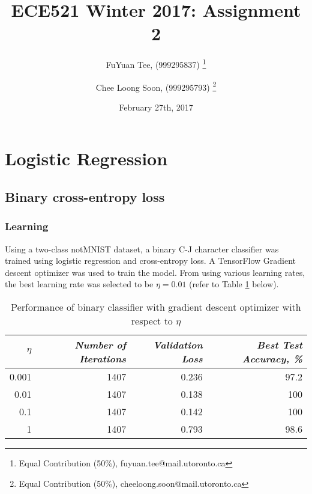 \documentclass[a4paper,12pt]{article}
\title{ECE521 Winter 2017: Assignment 2}
\author{FuYuan Tee, (999295837)
  \thanks{Equal Contribution (50\%), fuyuan.tee@mail.utoronto.ca}
\and Chee Loong Soon, (999295793) \thanks{Equal Contribution (50\%),  cheeloong.soon@mail.utoronto.ca}}
\date{February 27th, 2017}
\begin{document}
\maketitle
\tableofcontents
\clearpage
\section{Logistic Regression}
\subsection{Binary cross-entropy loss}
\subsubsection{Learning}

Using a two-class notMNIST dataset, a binary C-J character classifier was trained using logistic regression and cross-entropy loss. A TensorFlow Gradient descent optimizer was used to train the model. From using various learning rates, the best learning rate was selected to be $\eta = 0.01$ (refer to Table \ref{table:TuneLearningRateSGD} below).

\begin{table}[!htb]
\centering
\caption{Performance of binary classifier with gradient descent optimizer with respect to $\eta$}
\label{table:TuneLearningRateSGD}
\vspace{0.5em}
\begin{tabular}{|r|r r r|} \hline
$\eta$ & \textit{Number of Iterations} & \textit{Validation Loss} & \textit{Best Test Accuracy, \%} \\ \hline
0.001 & 1407 & 0.236 & 97.2 \\
0.01 & 1407 & 0.138 & 100 \\
0.1 & 1407 & 0.142 & 100 \\
1 & 1407 & 0.793 & 98.6 \\
\hline
\end{tabular}
\end{table}

\end{document}
